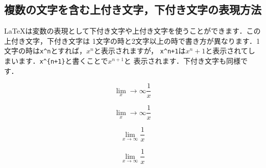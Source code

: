 \documentclass[dvipdfmx,uplatex]{jsarticle}
\begin{document}
{\subsection{複数の文字を含む上付き文字，下付き文字の表現方法}
\LaTeX は変数の表現として下付き文字や上付き文字を使うことができます．この上付き文字，下付き文字は
1文字の時と2文字以上の時で書き方が異なります．1文字の時は\verb|x^n|とすれば，$x^n$と表示されますが，
\verb|x^n+1|は$x^n+1$と表示されてしまいます．\verb|x^{n+1}|と書くことで$x^{n+1}$と
表示されます．下付き文字も同様です．
\begin{tcolorbox}[title=上付き文字と下付き文字の書き方]
  \begin{tcolorbox}[title=\{\}で囲まない, colframe=wrongcolor]
    \begin{excode}
      \begin{equation*}
        \lim_x \rightarrow \infty \frac{1}{x}
      \end{equation*}
    \end{excode}
    \begin{equation*}
      \lim_x \rightarrow \infty \frac{1}{x}
    \end{equation*}
  \end{tcolorbox}
  \begin{tcolorbox}[title=\{\}で囲む, colframe=correctcolor]
    \begin{excode}
      \begin{equation*}
        \lim_{x \rightarrow \infty} \frac{1}{x}
      \end{equation*}
    \end{excode}
    \begin{equation*}
      \lim_{x \rightarrow \infty} \frac{1}{x}
    \end{equation*}
  \end{tcolorbox}
\end{tcolorbox}

}
\end{document}
